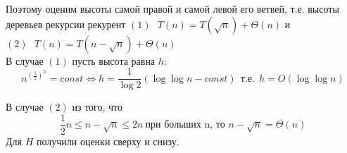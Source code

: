 \documentclass[a4paper,12pt]{article} %
\begin{document}
 Поэтому оценим высоты самой правой и самой левой его ветвей, т.е. высоты деревьев рекурсии рекурент $(1)~~~T(n) = T(\sqrt{n}) + \Theta(n)$ и  $(2)~~~T(n) = T(n - \sqrt{n}) + \Theta(n)$\\
 В случае $(1)$ пусть высота равна $h$:
 \[
	n^{\left(\frac{1}{2}\right)^h} = const \Leftrightarrow h = \frac{1}{\log{2}}(\log{\log{n}} - const)~~\text{т.е.}~~h = O(\log{\log{n}})
 \]
 
 В случае $(2)$ из того, что 
 \[
	\dfrac{1}{2}n \leq n - \sqrt{n} \leq 2n~\text{при больших n, то~} n - \sqrt{n} = \Theta(n)
 \]
 Для $H$ получили оценки сверху и снизу.\\
\end{document}
